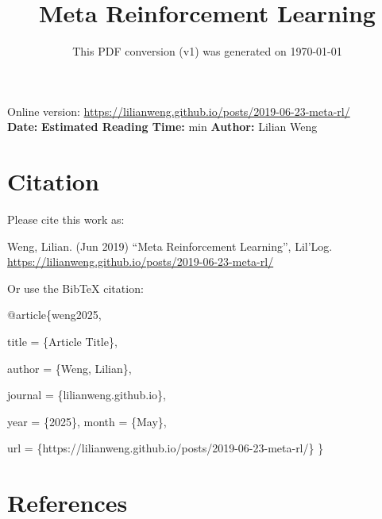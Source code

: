 \documentclass[12pt]{article}
\title{Meta Reinforcement Learning}
\date{This PDF conversion (v1) was generated on \today\footnotemark}
\begin{document}
\maketitle
\begin{center}
    Online version: \url{https://lilianweng.github.io/posts/2019-06-23-meta-rl/} \\
    \textbf{Date:} \quad
    \textbf{Estimated Reading Time:}  min \quad
    \textbf{Author:} Lilian Weng
\end{center}




\newpage
\tableofcontents
\newpage
\vspace{1em}
\n\n\n\section{Citation}
Please cite this work as:

\begin{tcolorbox}[colback=black!5!white, colframe=black!80!white, boxrule=0.5pt, arc=2mm, left=1mm, right=1mm, top=1mm, bottom=1mm]
  Weng, Lilian. (Jun 2019) ``Meta Reinforcement Learning'', Lil'Log. \url{https://lilianweng.github.io/posts/2019-06-23-meta-rl/}
  \end{tcolorbox}

Or use the BibTeX citation:

\begin{tcolorbox}[
    colback=black!5!white,
    colframe=black!80!white,
    boxrule=0.5pt,
    arc=2mm,
    left=1mm,
    right=1mm,
    top=1mm,
    bottom=1mm,
    listing only,
    listing options={
      basicstyle=\ttfamily\footnotesize,
      breaklines=true,
      literate={\{}{{\char`\{}}1 {\}}{{\char`\}}}1
    }
  ]
  @article\{weng2025,

    title   = \{Article Title\},

    author  = \{Weng, Lilian\},

    journal = \{lilianweng.github.io\},

    year    = \{2025\},
    month   = \{May\},

    url     = \{https://lilianweng.github.io/posts/2019-06-23-meta-rl/\}\n
  \}
  \end{tcolorbox}

\newpage
\section{References}

\n
\end{document}

